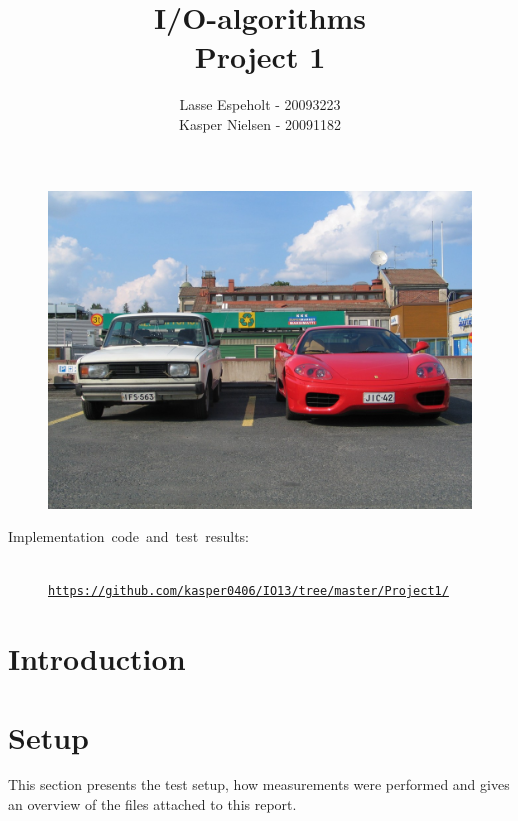 \documentclass[a4paper,12pt]{article}
\begin{document}
\title{I/O-algorithms\\Project 1}

\author{Lasse Espeholt - 20093223\\
Kasper Nielsen - 20091182\\}

\maketitle
\begin{figure}[h!]
\includegraphics[width=\textwidth]{"images/forside"}
\end{figure}


\vfill{}
\begin{description}
\item [{Implementation~code~and~test~results:}]~
\\
\texttt{\url{https://github.com/kasper0406/IO13/tree/master/Project1/}}
\end{description}
\pagebreak{}\tableofcontents{}\pagebreak{}

\section{Introduction}


\section{Setup}
This section presents the test setup, how measurements were performed
and gives an overview of the files attached to this report.
\end{document}
